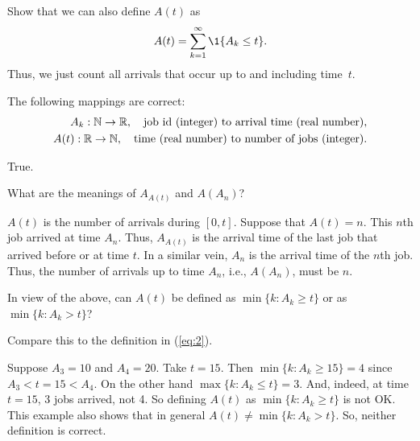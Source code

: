 \begin{extra}
Show that we can also define $A(t)$ as
\begin{equation}
  A(t) = \sum_{k=1}^\infty \1{A_k \leq t}.
\end{equation}
Thus, we just count all arrivals that occur up to and including time~$t$.
\end{extra}


\begin{extra}[\faBalanceScale]
The following mappings are correct:
\begin{align*}
  A_k : \mathbb{N} \to \mathbb{R}, \quad{\text{job id (integer) to arrival time (real number)}}, \\
  A(t) : \mathbb{R}\to \mathbb{N}, \quad{\text{time (real number) to number of jobs (integer)}}.
\end{align*}
\begin{solution}
  True. 
\end{solution}
\end{extra}

\begin{extra}
 What are  the meanings of $A_{A(t)}$ and $A(A_n)$?
 \begin{solution}
  $A(t)$ is the number of arrivals during $[0,t]$. Suppose that
    $A(t) = n$. This $n$th job arrived at time $A_n$. Thus, $A_{A(t)}$
    is the arrival time of the last job that arrived before or at time
    $t$. In a similar vein, $A_n$ is the arrival time of the $n$th
    job. Thus, the number of arrivals up to time $A_n$, i.e., $A(A_n)$,
    must be $n$.
  \end{solution}
\end{extra}

\begin{extra}\label{ex:22}
  In view of the above, can  $A(t)$ be defined as $\min\{k : A_k \geq t\}$ or as $\min\{k: A_k > t\}$?
  \begin{hint}
Compare this to the definition in (\ref{eq:2}).
  \end{hint}
  \begin{solution}
    Suppose $A_3 = 10$ and $A_4 = 20$. Take $t=15$. Then
    $\min\{k : A_k \geq 15\} = 4$ since $A_3 < t=15 < A_4$. On the
    other hand $\max\{k : A_k \leq t\} = 3$. And, indeed, at time $t=15$, 3 jobs arrived, not 4. So defining $A(t)$ as $\min\{k : A_k \geq t\}$ is not OK.  This example also shows that in general $A(t) \neq \min\{k : A_k > t\}$. So, neither definition is correct. 

  \end{solution}
\end{extra}

